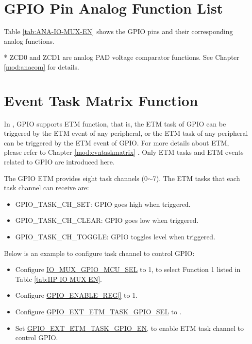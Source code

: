 \documentclass[main\_\_EN.tex]{subfiles}
\begin{document}
\section{GPIO Pin Analog Function List}
\label{sec:analog_pins}
Table \ref{tab:ANA-IO-MUX-EN} shows the GPIO pins and their corresponding analog functions.


\tableheaderAnalogFunctionsEN
\tablecontentAnalogFunctions

* ZCD0 and ZCD1 are analog PAD voltage comparator functions. See Chapter \ref{mod:anacom} \textit{} for details.

\section{Event Task Matrix Function}

In \chipname{}, GPIO supports ETM function, that is, the ETM task of GPIO can be triggered by the ETM event of any peripheral, or the ETM task of any peripheral can be triggered by the ETM event of GPIO. For more details about ETM, please refer to Chapter \ref{mod:evntaskmatrix} \textit{}. Only ETM tasks and ETM events related to GPIO are introduced here.

The GPIO ETM provides eight task channels  (0$\sim$7). The ETM tasks that each task channel can receive are:

\begin{itemize}
    \item GPIO\_TASK\_CH\_SET: GPIO goes high when triggered.
    \item GPIO\_TASK\_CH\_CLEAR: GPIO goes low when triggered.
    \item GPIO\_TASK\_CH\_TOGGLE: GPIO toggles level when triggered.
\end{itemize}

Below is an example to configure task channel   to control GPIO:

\begin{itemize}
    \item Configure \hyperref[fielddesc:IOMUXGPIONMCUSEL]{IO\_MUX\_GPIO\_MCU\_SEL} to 1, to select Function 1 listed in Table \ref{tab:HP-IO-MUX-EN}.
    \item Configure \hyperref[regdesc:GPIOENABLEREG]{GPIO\_ENABLE\_REG[]} to 1.
    \item Configure \hyperref[fielddesc:GPIOEXTETMTASKGPIO0SEL]{GPIO\_EXT\_ETM\_TASK\_GPIO\_SEL} to .
    \item Set \hyperref[fielddesc:GPIOEXTETMTASKGPIO0EN]{GPIO\_EXT\_ETM\_TASK\_GPIO\_EN}, to enable ETM task channel  to control GPIO.
\end{itemize}
\end{document}
